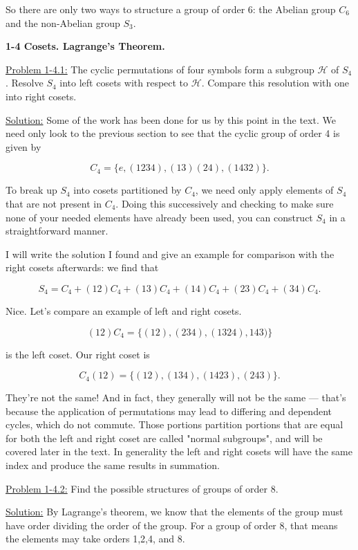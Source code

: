 \documentclass[12pt]{article}
\begin{document}
So there are only two ways to structure a group of order 6: the Abelian group
$C_6$ and the non-Abelian group $S_3$.

\newpage

\textbf{1-4 Cosets. Lagrange's Theorem.}

\underline{Problem 1-4.1:} The cyclic permutations of four symbols form a
subgroup $\mathcal{H}$ of $S_4$. Resolve $S_4$ into left cosets with respect to
$\mathcal{H}$. Compare this resolution with one into right cosets.

\underline{Solution:} Some of the work has been done for us by this point in
the text. We need only look to the previous section to see that the cyclic
group of order 4 is given by

\[ 
C_4 = \{ e, (1234), (13)(24), (1432)\}.
\]

To break up $S_4$ into cosets partitioned by $C_4$, we need only apply elements
of $S_4$ that are not present in $C_4$. Doing this successively and checking
to make sure none of your needed elements have already been used, you can
construct $S_4$ in a straightforward manner. 

I will write the solution I found and give an example for comparison with the
right cosets afterwards: we find that 

\[
    S_4 = C_4 + (12)C_4 + (13)C_4 + (14)C_4 + (23)C_4 + (34)C_4.
\]

Nice. Let's compare an example of left and right cosets.

\[
    (12)C_4 = \{ (12), (234), (1324), 143)  \}
\]

is the left coset. Our right coset is

\[
    C_4(12) = \{ (12), (134), (1423), (243)  \}.
\]

They're not the same! And in fact, they generally will not be the same ---
that's because the application of permutations may lead to differing and 
dependent cycles, which do not commute. Those portions partition portions that
are equal for both the left and right coset are called "normal subgroups",
and will be covered later in the text. In generality the left and right cosets
will have the same index and produce the same results in summation. 

\underline{Problem 1-4.2:} Find the possible structures of groups of order 8.

\underline{Solution:} By Lagrange's theorem, we know that the elements of the
group must have order dividing the order of the group. For a group of order 8,
that means the elements may take orders 1,2,4, and 8. 
\end{document}

